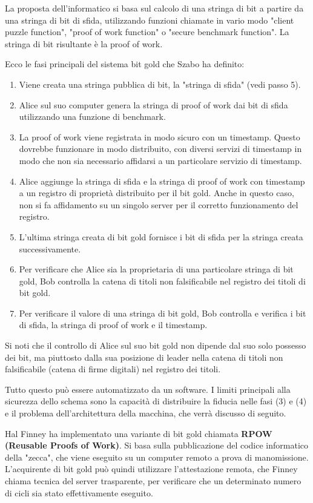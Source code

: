 La proposta dell'informatico si basa sul calcolo di una stringa di bit a partire da una stringa di bit di sfida, utilizzando funzioni chiamate in vario modo "client puzzle function", "proof of work function" o "secure benchmark function". La stringa di bit risultante è la proof of work.

Ecco le fasi principali del sistema bit gold che Szabo ha definito:

\begin{enumerate}
  \item Viene creata una stringa pubblica di bit, la "stringa di sfida" (vedi passo 5).
  \item Alice sul suo computer genera la stringa di proof of work dai bit di sfida utilizzando una funzione di benchmark.
  \item La proof of work viene registrata in modo sicuro con un timestamp. Questo dovrebbe funzionare in modo distribuito, con diversi servizi di timestamp in modo che non sia necessario affidarsi a un particolare servizio di timestamp.
  \item Alice aggiunge la stringa di sfida e la stringa di proof of work con timestamp a un registro di proprietà distribuito per il bit gold. Anche in questo caso, non si fa affidamento su un singolo server per il corretto funzionamento del registro.
  \item L'ultima stringa creata di bit gold fornisce i bit di sfida per la stringa creata successivamente.
  \item Per verificare che Alice sia la proprietaria di una particolare stringa di bit gold, Bob controlla la catena di titoli non falsificabile nel registro dei titoli di bit gold.
  \item Per verificare il valore di una stringa di bit gold, Bob controlla e verifica i bit di sfida, la stringa di proof of work e il timestamp.
\end{enumerate}

Si noti che il controllo di Alice sul suo bit gold non dipende dal suo solo possesso dei bit, ma piuttosto dalla sua posizione di leader nella catena di titoli non falsificabile (catena di firme digitali) nel registro dei titoli.

Tutto questo può essere automatizzato da un software. I limiti principali alla sicurezza dello schema sono la capacità di distribuire la fiducia nelle fasi (3) e (4) e il problema dell'architettura della macchina, che verrà discusso di seguito.

Hal Finney ha implementato una variante di bit gold chiamata \textbf{RPOW (Reusable Proofs of Work)}. Si basa sulla pubblicazione del codice informatico della "zecca", che viene eseguito su un computer remoto a prova di manomissione. L'acquirente di bit gold può quindi utilizzare l'attestazione remota, che Finney chiama tecnica del server trasparente, per verificare che un determinato numero di cicli sia stato effettivamente eseguito.

